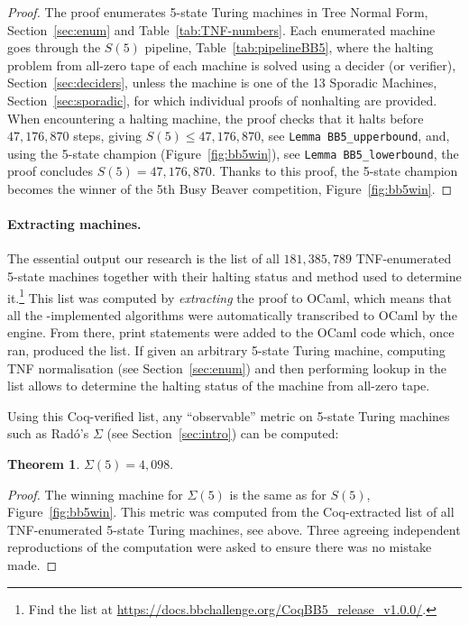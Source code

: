 \documentclass[letterpaper,british,11pt]{article}
\theoremstyle{definition} %
\newtheorem{theorem}{Theorem}[section]
\numberwithin{equation}{section}
\theoremstyle{definition} %
\newcommand{\BBtheFifthTNF}{181{,}385{,}789}
\newcommand{\rado}{Rad\'o\xspace}
\newcommand{\numSporadic}{13\xspace}
\begin{document}
\thBBTheFifth*
\begin{proof}
    The \Coq proof enumerates 5-state Turing machines in Tree Normal Form, Section~\ref{sec:enum} and Table~\ref{tab:TNF-numbers}. Each enumerated machine goes through the $S(5)$ pipeline, Table~\ref{tab:pipelineBB5}, where the halting problem from all-zero tape of each machine is solved using a decider (or verifier), Section~\ref{sec:deciders}, unless the machine is one of the \numSporadic Sporadic Machines, Section~\ref{sec:sporadic}, for which individual \Coq proofs of nonhalting are provided.
    When encountering a halting machine, the proof checks that it halts before $47{,}176{,}870$ steps, giving $S(5) \leq 47{,}176{,}870$, see \texttt{Lemma BB5\_upperbound}, and, using the 5-state champion (Figure~\ref{fig:bb5win}), see \texttt{Lemma BB5\_lowerbound}, the proof concludes $S(5) = 47{,}176{,}870$. Thanks to this proof, the 5-state champion becomes the winner of the 5th Busy Beaver competition, Figure~\ref{fig:bb5win}.
\end{proof}

\paragraph{Extracting machines.} The essential output our research is the list of all $\BBtheFifthTNF$ TNF-enumerated 5-state machines together with their halting status and method used to determine it.\footnote{Find the list at \url{https://docs.bbchallenge.org/CoqBB5_release_v1.0.0/}.} This list was computed by \textit{extracting} the \Coq proof to OCaml, which means that all the \Coq-implemented algorithms were automatically transcribed to OCaml by the \Coq engine. From there, print statements were added to the OCaml code which, once ran, produced the list. If given an arbitrary 5-state Turing machine, computing TNF normalisation (see Section~\ref{sec:enum}) and then performing lookup in the list allows to determine the halting status of the machine from all-zero tape.

Using this Coq-verified list, any ``observable'' metric on 5-state Turing machines such as \rado's $\Sigma$ (see Section~\ref{sec:intro}) can be computed:

\begin{theorem}\label{th:Sigma5}
    $\Sigma(5) = 4{,}098$.
\end{theorem}
\begin{proof}
    The winning machine for $\Sigma(5)$ is the same as for $S(5)$, Figure~\ref{fig:bb5win}.
    This metric was computed from the Coq-extracted list of all TNF-enumerated 5-state Turing machines, see above. Three agreeing independent reproductions of the computation were asked to ensure there was no mistake made.
\end{proof}
\end{document}
